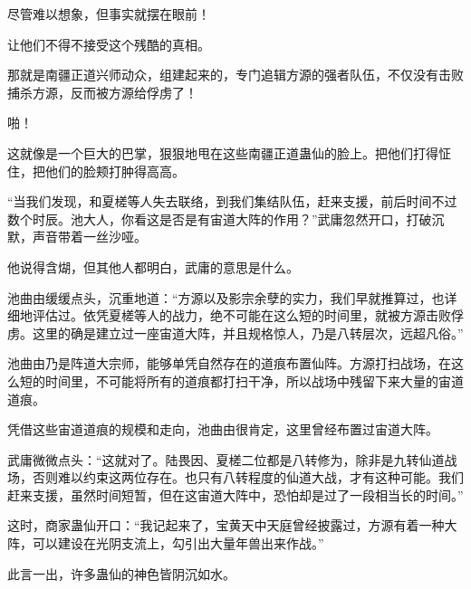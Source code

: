 \begin{this_body}
尽管难以想象，但事实就摆在眼前！

让他们不得不接受这个残酷的真相。

那就是南疆正道兴师动众，组建起来的，专门追辑方源的强者队伍，不仅没有击败捕杀方源，反而被方源给俘虏了！

啪！

这就像是一个巨大的巴掌，狠狠地甩在这些南疆正道蛊仙的脸上。把他们打得怔住，把他们的脸颊打肿得高高。

“当我们发现，和夏槎等人失去联络，到我们集结队伍，赶来支援，前后时间不过数个时辰。池大人，你看这是否是有宙道大阵的作用？”武庸忽然开口，打破沉默，声音带着一丝沙哑。

他说得含煳，但其他人都明白，武庸的意思是什么。

池曲由缓缓点头，沉重地道：“方源以及影宗余孽的实力，我们早就推算过，也详细地评估过。依凭夏槎等人的战力，绝不可能在这么短的时间里，就被方源击败俘虏。这里的确是建立过一座宙道大阵，并且规格惊人，乃是八转层次，远超凡俗。”

池曲由乃是阵道大宗师，能够单凭自然存在的道痕布置仙阵。方源打扫战场，在这么短的时间里，不可能将所有的道痕都打扫干净，所以战场中残留下来大量的宙道道痕。

凭借这些宙道道痕的规模和走向，池曲由很肯定，这里曾经布置过宙道大阵。

武庸微微点头：“这就对了。陆畏因、夏槎二位都是八转修为，除非是九转仙道战场，否则难以约束这两位存在。也只有八转程度的仙道大战，才有这种可能。我们赶来支援，虽然时间短暂，但在这宙道大阵中，恐怕却是过了一段相当长的时间。”

这时，商家蛊仙开口：“我记起来了，宝黄天中天庭曾经披露过，方源有着一种大阵，可以建设在光阴支流上，勾引出大量年兽出来作战。”

此言一出，许多蛊仙的神色皆阴沉如水。

\end{this_body}


